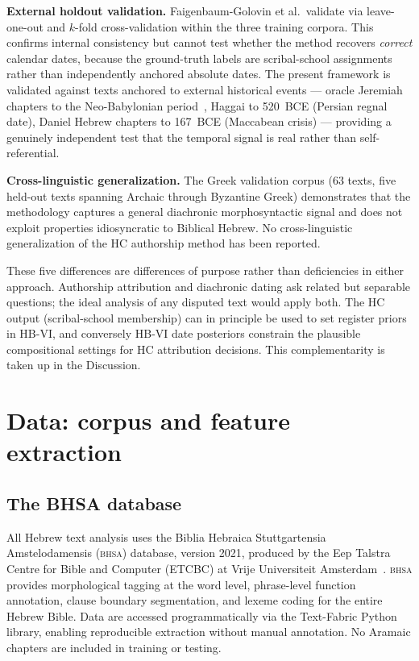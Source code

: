 \documentclass[10pt,letterpaper]{article}
\newcommand{\bhsa}{\textsc{bhsa}}
\newcommand{\hbvi}{HB-VI}
\begin{document}
\textbf{External holdout validation.}
Faigenbaum-Golovin et al.\ validate via leave-one-out and $k$-fold
cross-validation within the three training corpora.  This confirms internal
consistency but cannot test whether the method recovers \emph{correct}
calendar dates, because the ground-truth labels are scribal-school
assignments rather than independently anchored absolute dates.  The present
framework is validated against texts anchored to external historical events
--- oracle Jeremiah chapters to the Neo-Babylonian
period~\cite{Hurvitz1999}, Haggai to 520~BCE (Persian regnal date),
Daniel Hebrew chapters to 167~BCE (Maccabean crisis) --- providing a
genuinely independent test that the temporal signal is real rather than
self-referential.

\textbf{Cross-linguistic generalization.}
The Greek validation corpus (63 texts, five held-out texts spanning Archaic
through Byzantine Greek) demonstrates that the methodology captures a
general diachronic morphosyntactic signal and does not exploit properties
idiosyncratic to Biblical Hebrew.  No cross-linguistic generalization of
the HC authorship method has been reported.

These five differences are differences of purpose rather than
deficiencies in either approach.  Authorship attribution and diachronic
dating ask related but separable questions; the ideal analysis of any
disputed text would apply both.  The HC output (scribal-school membership)
can in principle be used to set register priors in \hbvi{}, and
conversely \hbvi{} date posteriors constrain the plausible compositional
settings for HC attribution decisions.  This complementarity is taken up
in the Discussion.

\section*{Data: corpus and feature extraction}

\subsection*{The BHSA database}

All Hebrew text analysis uses the Biblia Hebraica Stuttgartensia
Amstelodamensis (\bhsa{}) database, version 2021, produced by the Eep
Talstra Centre for Bible and Computer (ETCBC) at Vrije Universiteit
Amsterdam~\cite{BHSA2021,Roorda2018,Roorda2014}.  \bhsa{} provides
morphological tagging at the word level, phrase-level function annotation,
clause boundary segmentation, and lexeme coding for the entire Hebrew
Bible.  Data are accessed programmatically via the Text-Fabric Python
library, enabling reproducible extraction without manual annotation.  No
Aramaic chapters are included in training or testing.
\end{document}
